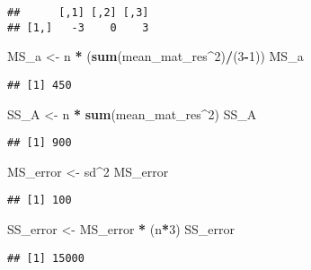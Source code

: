 \documentclass[]{article}
\newenvironment{Shaded}{\begin{snugshade}}{\end{snugshade}}
\newcommand{\KeywordTok}[1]{\textcolor[rgb]{0.13,0.29,0.53}{\textbf{#1}}}
\newcommand{\DecValTok}[1]{\textcolor[rgb]{0.00,0.00,0.81}{#1}}
\newcommand{\StringTok}[1]{\textcolor[rgb]{0.31,0.60,0.02}{#1}}
\newcommand{\OperatorTok}[1]{\textcolor[rgb]{0.81,0.36,0.00}{\textbf{#1}}}
\newcommand{\NormalTok}[1]{#1}
\begin{document}
\begin{verbatim}
##      [,1] [,2] [,3]
## [1,]   -3    0    3
\end{verbatim}

\begin{Shaded}
\begin{Highlighting}[]
\NormalTok{MS_a <-}\StringTok{ }\NormalTok{n }\OperatorTok{*}\StringTok{ }\NormalTok{(}\KeywordTok{sum}\NormalTok{(mean_mat_res}\OperatorTok{^}\DecValTok{2}\NormalTok{)}\OperatorTok{/}\NormalTok{(}\DecValTok{3}\OperatorTok{-}\DecValTok{1}\NormalTok{))}
\NormalTok{MS_a}
\end{Highlighting}
\end{Shaded}

\begin{verbatim}
## [1] 450
\end{verbatim}

\begin{Shaded}
\begin{Highlighting}[]
\NormalTok{SS_A <-}\StringTok{ }\NormalTok{n }\OperatorTok{*}\StringTok{ }\KeywordTok{sum}\NormalTok{(mean_mat_res}\OperatorTok{^}\DecValTok{2}\NormalTok{)}
\NormalTok{SS_A}
\end{Highlighting}
\end{Shaded}

\begin{verbatim}
## [1] 900
\end{verbatim}

\begin{Shaded}
\begin{Highlighting}[]
\NormalTok{MS_error <-}\StringTok{ }\NormalTok{sd}\OperatorTok{^}\DecValTok{2}
\NormalTok{MS_error}
\end{Highlighting}
\end{Shaded}

\begin{verbatim}
## [1] 100
\end{verbatim}

\begin{Shaded}
\begin{Highlighting}[]
\NormalTok{SS_error <-}\StringTok{ }\NormalTok{MS_error }\OperatorTok{*}\StringTok{ }\NormalTok{(n}\OperatorTok{*}\DecValTok{3}\NormalTok{) }
\NormalTok{SS_error}
\end{Highlighting}
\end{Shaded}

\begin{verbatim}
## [1] 15000
\end{verbatim}
\end{document}

